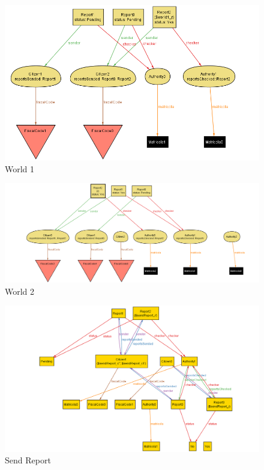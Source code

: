 \documentclass{article}
\begin{document}
\begin{figure}[H]
    \centering
    \includegraphics[scale=0.4]{img/alloy/world1_magic.png}
    \caption{World 1}
\end{figure}

\begin{figure}[H]
    \centering
    \includegraphics[scale=0.4]{img/alloy/world2_magic.png}
    \caption{World 2}
\end{figure}

\begin{figure}[H]
    \centering
    \includegraphics[scale=0.4]{img/alloy/graphical_sendReport.png}
    \caption{Send Report}
\end{figure}
\end{document}
